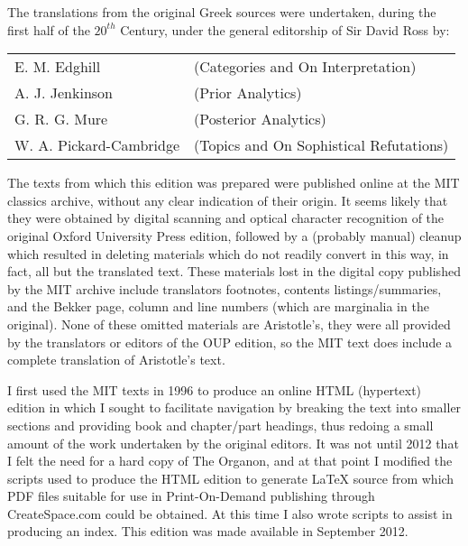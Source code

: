 The translations from the original Greek sources were undertaken, during the first half of the \ensuremath{20^{th}} Century, under the general editorship of Sir David Ross by:

\vspace{0.2in}

\begin{centering}
\begin{tabular}{l l}
E. M. Edghill & (Categories and On Interpretation)\\
A. J. Jenkinson & (Prior Analytics)\\
G. R. G. Mure & (Posterior Analytics)\\
W. A. Pickard-Cambridge & (Topics and On Sophistical Refutations)
\end{tabular}
\end{centering}

\vspace{0.2in}

The texts from which this edition was prepared were published online at the MIT classics archive, without any clear indication of their origin.
It seems likely that they were obtained by digital scanning and optical character recognition of the original Oxford University Press edition, followed by a (probably manual) cleanup which resulted in deleting materials which do not readily convert in this way, in fact, all but the translated text.
These materials lost in the digital copy published by the MIT archive include translators footnotes, contents listings/summaries, and the Bekker page, column and line numbers (which are marginalia in the original).
None of these omitted materials are Aristotle's, they were all provided by the translators or editors of the OUP edition, so the MIT text does include a complete translation of Aristotle's text.

I first used the MIT texts in 1996 to produce an online HTML (hypertext) edition in which I sought to facilitate navigation by breaking the text into smaller sections and providing book and chapter/part headings, thus redoing a small amount of the work undertaken by the original editors.
It was not until 2012 that I felt the need for a hard copy of The Organon, and at that point I modified the scripts used to produce the HTML edition to generate {\LaTeX} source from which PDF files suitable for use in Print-On-Demand publishing through CreateSpace.com could be obtained.
At this time I also wrote scripts to assist in producing an index.
This edition was made available in September 2012.

